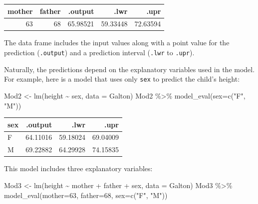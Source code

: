 \documentclass[
  letterpaper,
  DIV=11,
  numbers=noendperiod,
  oneside]{scrreprt}
\newenvironment{Shaded}{\begin{snugshade}}{\end{snugshade}}
\newcommand{\AttributeTok}[1]{\textcolor[rgb]{0.40,0.45,0.13}{#1}}
\newcommand{\DecValTok}[1]{\textcolor[rgb]{0.68,0.00,0.00}{#1}}
\newcommand{\FunctionTok}[1]{\textcolor[rgb]{0.28,0.35,0.67}{#1}}
\newcommand{\NormalTok}[1]{\textcolor[rgb]{0.00,0.23,0.31}{#1}}
\newcommand{\OtherTok}[1]{\textcolor[rgb]{0.00,0.23,0.31}{#1}}
\newcommand{\SpecialCharTok}[1]{\textcolor[rgb]{0.37,0.37,0.37}{#1}}
\newcommand{\StringTok}[1]{\textcolor[rgb]{0.13,0.47,0.30}{#1}}
\begin{document}
\ttfamily 
\begin{tabular}{rrrrr}
\toprule
mother & father & .output & .lwr & .upr\\
\midrule
63 & 68 & 65.98521 & 59.33448 & 72.63594\\
\bottomrule
\end{tabular} \normalfont
\bigskip

The data frame includes the input values along with a point value for
the prediction (\texttt{.output}) and a prediction interval
(\texttt{.lwr} to \texttt{.upr}).

Naturally, the predictions depend on the explanatory variables used in
the model. For example, here is a model that uses only \texttt{sex} to
predict the child's height:

\begin{Shaded}
\begin{Highlighting}[]
\NormalTok{Mod2 }\OtherTok{\textless{}{-}} \FunctionTok{lm}\NormalTok{(height }\SpecialCharTok{\textasciitilde{}}\NormalTok{ sex, }\AttributeTok{data =}\NormalTok{ Galton)}
\NormalTok{Mod2 }\SpecialCharTok{\%\textgreater{}\%} \FunctionTok{model\_eval}\NormalTok{(}\AttributeTok{sex=}\FunctionTok{c}\NormalTok{(}\StringTok{"F"}\NormalTok{, }\StringTok{"M"}\NormalTok{))}
\end{Highlighting}
\end{Shaded}

\ttfamily 
\begin{tabular}{lrrr}
\toprule
sex & .output & .lwr & .upr\\
\midrule
F & 64.11016 & 59.18024 & 69.04009\\
M & 69.22882 & 64.29928 & 74.15835\\
\bottomrule
\end{tabular} \normalfont
\bigskip

This model includes three explanatory variables:

\begin{Shaded}
\begin{Highlighting}[]
\NormalTok{Mod3 }\OtherTok{\textless{}{-}} \FunctionTok{lm}\NormalTok{(height }\SpecialCharTok{\textasciitilde{}}\NormalTok{ mother }\SpecialCharTok{+}\NormalTok{ father }\SpecialCharTok{+}\NormalTok{ sex, }\AttributeTok{data =}\NormalTok{ Galton)}
\NormalTok{Mod3 }\SpecialCharTok{\%\textgreater{}\%} \FunctionTok{model\_eval}\NormalTok{(}\AttributeTok{mother=}\DecValTok{63}\NormalTok{, }\AttributeTok{father=}\DecValTok{68}\NormalTok{, }\AttributeTok{sex=}\FunctionTok{c}\NormalTok{(}\StringTok{"F"}\NormalTok{, }\StringTok{"M"}\NormalTok{))}
\end{Highlighting}
\end{Shaded}
\end{document}
